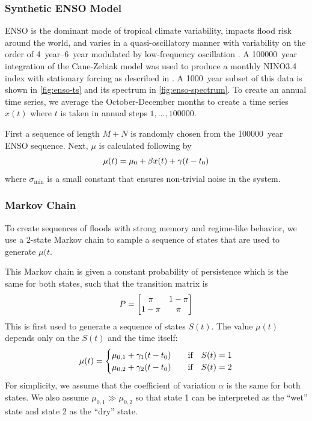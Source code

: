 \documentclass[12pt]{article}
\begin{document}
\subsubsection{Synthetic ENSO Model\label{methods-enso}}

ENSO is the dominant mode of tropical climate variability, impacts flood risk around the world, and varies in a quasi-oscillatory manner with variability on the order of \SIrange{4}{6}{year} modulated by low-frequency oscillation \citep[see][for a comprehensive review]{Sarachik2010}.
A \SI{100000}{year} integration of the Cane-Zebiak model \citep{Zebiak1987} was used to produce a monthly NINO3.4 index with stationary forcing as described in \citet{Ramesh2017}.
A \SI{1000}{year} subset of this data is shown in \cref{fig:enso-ts} and its spectrum in \cref{fig:enso-spectrum}.
To create an annual time series, we average the October-December months to create a time series \( x(t) \) where \( t \) is taken in annual steps \(1, \ldots, \num{100000} \).

First a sequence of length \(M+N\) is randomly chosen from the \SI{100000}{year} ENSO sequence.
Next, \(\mu\) is calculated following by
\begin{equation}
  \mu(t) = \mu_0 + \beta x(t) + \gamma \qty(t - t_0)
\end{equation}
where \(\sigma_\text{min}\) is a small constant that ensures non-trivial noise in the system.

\subsubsection{Markov Chain\label{methods-markov}}

To create sequences of floods with strong memory and regime-like behavior, we use a 2-state Markov chain to sample a sequence of states that are used to generate \(\mu(t\).

This Markov chain is given a constant probability of persistence which is the same for both states, such that the transition matrix is
\begin{equation*}
  P = \mqty[\pi & 1-\pi \\ 1-\pi & \pi]
\end{equation*}
This is first used to generate a sequence of states \(S(t)\).
The value \( \mu(t) \) depends only on the \(S(t)\) and the time itself:
\begin{equation*}
  \mu(t) = \begin{cases}
    \mu_{0,1} + \gamma_1 \qty(t - t_0) & \qqtext{if} S(t) = 1 \\
    \mu_{0,2} + \gamma_2 \qty(t - t_0) & \qqtext{if} S(t) = 2
  \end{cases}
\end{equation*}
For simplicity, we assume that the coefficient of variation \( \alpha \) is the same for both states.
We also assume \( \mu_{0, 1} \gg \mu_{0, 2} \) so that state 1 can be interpreted as the ``wet'' state and state 2 as the ``dry'' state.
\end{document}
